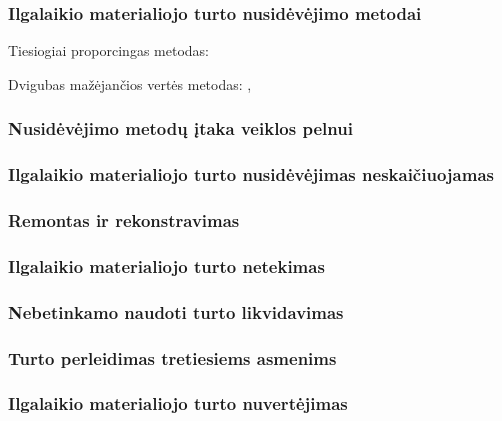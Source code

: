 
\subsubsection{Ilgalaikio materialiojo turto nusidėvėjimo metodai}


Tiesiogiai proporcingas metodas: 

Dvigubas mažėjančios vertės metodas: , 

\subsubsection{Nusidėvėjimo metodų įtaka veiklos pelnui}


\subsubsection{Ilgalaikio materialiojo turto nusidėvėjimas neskaičiuojamas}


\subsubsection{Remontas ir rekonstravimas}


\subsubsection{Ilgalaikio materialiojo turto netekimas}


\subsubsection{Nebetinkamo naudoti turto likvidavimas}



\subsubsection{Turto perleidimas tretiesiems asmenims}


\subsubsection{Ilgalaikio materialiojo turto nuvertėjimas}

